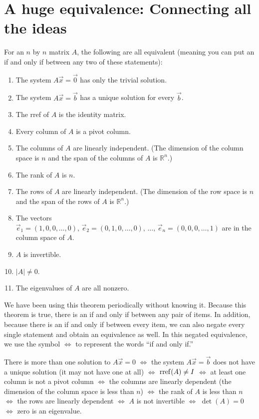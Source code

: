 \section{A huge equivalence: Connecting all the ideas}

\begin{theorem}\label{huge equivalence}
 For an $n$ by $n$ matrix $A$, the following are all equivalent (meaning you can put an if and only if between any two of these statements):
\begin{enumerate}
	\item The system $A\vec x=\vec 0$ has only the trivial solution.
	\item The system $A\vec x=\vec b$ has a unique solution for every $\vec b$.
	\item The rref of $A$ is the identity matrix.
	\item Every column of $A$ is a pivot column. 
	\item The columns of $A$ are linearly independent. (The dimension of the column space is $n$ and the span of the columns of $A$ is ${\mathbb{R}}^n$.)
	\item The rank of $A$ is $n$.
	\item The rows of $A$ are linearly independent. (The dimension of the row space is $n$ and the span of the rows of $A$ is ${\mathbb{R}}^n$.)
	\item The vectors $\vec e_1 = (1,0,0,\ldots,0),\, \vec e_2 = (0,1,0,\ldots,0),\,\ldots,\, \vec e_n = (0,0,0,\ldots,1)$ are in the column space of $A$.
	\item $A$ is invertible.
	\item $|A|\neq 0$.
	\item The eigenvalues of $A$ are all nonzero.	
\end{enumerate}
\end{theorem}

We have been using this theorem periodically without knowing it. Because this theorem is true, there is an if and only if between any pair of items.  In addition, because there is an if and only if between every item, we can also negate every single statement and obtain an equivalence as well.  In this negated equivalence, we use the symbol $\iff$ to represent the words ``if and only if.''
\begin{theorem}\label{huge equivalence negated}
	There is more than one solution to  $A\vec x=0$ $\iff$ the system $A\vec x=\vec b$ does not have a unique solution (it may not have one at all) $\iff$ $\operatorname{rref}(A)\neq I$  $\iff$ at least one column is not a pivot column  $\iff$ the columns are linearly dependent (the dimension of the column space is less than $n$)  $\iff$ the rank of $A$ is less than $n$  $\iff$ the rows are linearly dependent  $\iff$ $A$ is not invertible $\iff$ $\det(A)=0$  $\iff$ zero is an eigenvalue.
\end{theorem}

